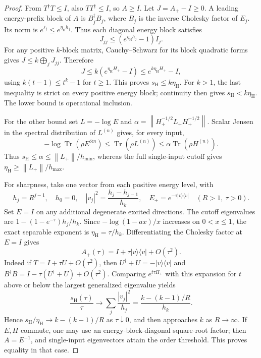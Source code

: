 \documentclass[11pt,a4paper]{article}
\theoremstyle{remark}
\DeclareMathOperator{\Tr}{Tr}
\newcommand{\ket}[1]{|#1\rangle}
\newcommand{\bra}[1]{\langle #1|}
\newcommand{\norm}[1]{\left\|#1\right\|}
\newcommand{\ep}{E_+}
\newcommand{\hp}{H_+}
\newcommand{\sh}{s_{\mathrm H}}
\newcommand{\etah}{\eta_{\mathrm H}}
\begin{document}
\begin{proof}
From \(T^\dagger T\leq I\), also \(TT^\dagger\leq I\), so \(A\geq I\).
Let \(J=A_+-I\geq0\). A leading energy-prefix block of \(A\) is
\(B_j^\dagger B_j\), where \(B_j\) is the inverse Cholesky factor of
\(E_j\). Its norm is \(e^{\ell_j}\leq e^{\etah h_j}\).
Thus each diagonal energy block satisfies
\[
 J_{jj}\leq(e^{\etah h_j}-1)I_j.
\]
For any positive \(k\)-block matrix, Cauchy--Schwarz for its block
quadratic forms gives \(J\leq k\bigoplus_jJ_{jj}\). Therefore
\[
 J\leq k(e^{\etah\hp}-I)\leq e^{k\etah\hp}-I,
\]
using \(k(t-1)\leq t^k-1\) for \(t\geq1\).
This proves \(\sh\leq k\etah\). For \(k>1\), the last inequality is
strict on every positive energy block; continuity then gives
\(\sh<k\etah\). The lower bound is operational inclusion.

For the other bound set \(L=-\log E\) and
\(\alpha=\norm{\hp^{-1/2}L_+\hp^{-1/2}}\).
Scalar Jensen in the spectral distribution of \(L^{(n)}\) gives, for
every input,
\begin{equation}\label{eq:jensen}
 -\log\Tr(\rho E^{\otimes n})
 \leq\Tr(\rho L^{(n)})\leq\alpha\Tr(\rho H^{(n)}).
\end{equation}
Thus \(\sh\leq\alpha\leq\norm{L_+}/h_{\min}\), whereas the full
single-input cutoff gives \(\etah\geq\norm{L_+}/h_{\max}\).

For sharpness, take one vector from each positive energy level, with
\[
 h_j=R^{j-1},\quad h_0=0,\quad
 |v_j|^2=\frac{h_j-h_{j-1}}{h_k},\quad
 \ep=e^{-\tau\ket v\bra v}\quad(R>1,\ \tau>0).
\]
Set \(E=I\) on any additional degenerate excited directions.
The cutoff eigenvalues are
\(1-(1-e^{-\tau})h_j/h_k\).
Since \(-\log(1-a x)/x\) increases on \(0<x\leq1\), the exact
separable exponent is \(\etah=\tau/h_k\).
Differentiating the Cholesky factor at \(E=I\) gives
\[
 A_+(\tau)=I+\tau\ket v\bra v+O(\tau^2).
\]
Indeed if \(T=I+\tau U+O(\tau^2)\), then
\(U^\dagger+U=-\ket v\bra v\) and
\(B^\dagger B=I-\tau(U^\dagger+U)+O(\tau^2)\).
Comparing \(e^{t\tau\hp}\) with this expansion for \(t\) above or below
the largest generalized eigenvalue yields
\[
 \frac{\sh(\tau)}{\tau}\longrightarrow
 \sum_j\frac{|v_j|^2}{h_j}
 =\frac{k-(k-1)/R}{h_k}.
\]
Hence \(\sh/\etah\to k-(k-1)/R\) as \(\tau\downarrow0\), and then
approaches \(k\) as \(R\to\infty\).
If \(E,H\) commute, one may use an energy-block-diagonal square-root
factor; then \(A=E^{-1}\), and single-input eigenvectors attain the
order threshold. This proves equality in that case.
\end{proof}
\end{document}
